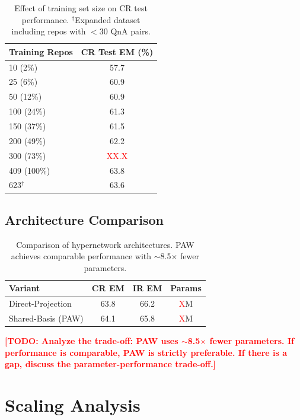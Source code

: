 \documentclass[11pt]{article}
\newcommand{\todo}[1]{\textcolor{red}{\textbf{[TODO: #1]}}}
\newcommand{\todoinline}[1]{\textcolor{red}{#1}}
\begin{document}
\begin{table}[t]
\centering
\small
\begin{tabular}{lc}
\toprule
Training Repos & CR Test EM (\%) \\
\midrule
10 (2\%) & 57.7 \\
25 (6\%) & 60.9 \\
50 (12\%) & 60.9 \\
100 (24\%) & 61.3 \\
150 (37\%) & 61.5 \\
200 (49\%) & 62.2 \\
300 (73\%) & \todoinline{XX.X} \\
409 (100\%) & 63.8 \\
623$^\dagger$ & 63.6 \\
\bottomrule
\end{tabular}
\caption{Effect of training set size on CR test performance. $^\dagger$Expanded dataset including repos with $<$30 QnA pairs.}
\label{tab:ablation_data}
\end{table}

\subsection{Architecture Comparison}

\begin{table}[t]
\centering
\small
\begin{tabular}{lccc}
\toprule
Variant & CR EM & IR EM & Params \\
\midrule
Direct-Projection & 63.8 & 66.2 & \todoinline{X}M \\
Shared-Basis (PAW) & 64.1 & 65.8 & \todoinline{X}M \\
\bottomrule
\end{tabular}
\caption{Comparison of hypernetwork architectures. PAW achieves comparable performance with $\sim$8.5$\times$ fewer parameters.}
\label{tab:ablation_arch}
\end{table}

\todo{Analyze the trade-off: PAW uses $\sim$8.5$\times$ fewer parameters. If performance is comparable, PAW is strictly preferable. If there is a gap, discuss the parameter-performance trade-off.}

\section{Scaling Analysis}
\label{sec:scaling}
\end{document}
